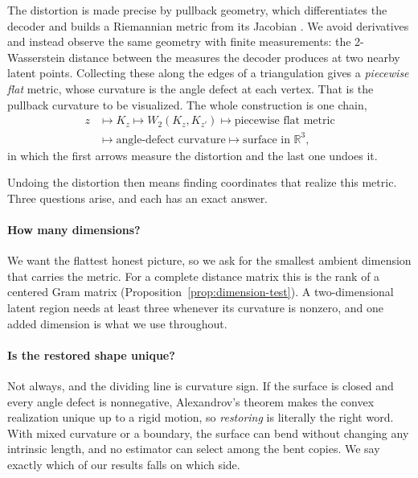 The distortion is made precise by pullback geometry, which differentiates the
decoder and builds a Riemannian metric from its Jacobian
\cite{arvanitidis2018,chen2018,roy2022}.  We avoid derivatives and instead
observe the same geometry with finite measurements: the 2-Wasserstein distance
between the measures the decoder produces at two nearby latent points.
Collecting these along the edges of a triangulation gives a
\emph{piecewise flat} metric, whose curvature is the angle defect at each
vertex.  That is the pullback curvature to be visualized.  The
whole construction is one chain,
\begin{equation}
 \begin{aligned}
 z&\longmapsto K_z
 \longmapsto W_2(K_z,K_{z'})
 \longmapsto \text{piecewise flat metric}\\
 &\longmapsto \text{angle-defect curvature}
 \longmapsto \text{surface in }\mathbb R^3,
 \end{aligned}
 \label{eq:paper-chain}
\end{equation}
in which the first arrows measure the distortion and the last one undoes it.

Undoing the distortion then means finding coordinates that realize this
metric.  Three questions arise, and each has an exact answer.

\paragraph{How many dimensions?}
We want the flattest honest picture, so we ask for the smallest ambient
dimension that carries the metric.  For a complete distance matrix this is the
rank of a centered Gram matrix (Proposition~\ref{prop:dimension-test}).  A
two-dimensional latent region needs at least three whenever its curvature is
nonzero, and one added dimension is what we use throughout.

\paragraph{Is the restored shape unique?}
Not always, and the dividing line is curvature sign.  If the surface is closed
and every angle defect is nonnegative, Alexandrov's theorem makes the convex
realization unique up to a rigid motion, so \emph{restoring} is literally the
right word.  With mixed curvature or a boundary, the surface can bend without
changing any intrinsic length, and no estimator can select among the bent
copies.  We say exactly which of our results falls on which side.

